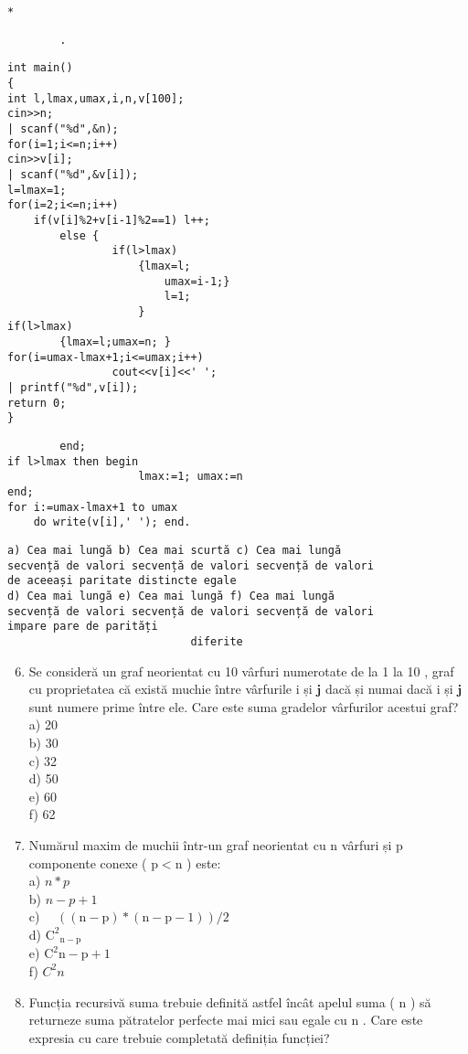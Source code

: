 \begin{verbatim}
*
\end{verbatim}

\begin{verbatim}
        .
\end{verbatim}

\begin{verbatim}
int main()
{
int l,lmax,umax,i,n,v[100];
cin>>n;
| scanf("%d",&n);
for(i=1;i<=n;i++)
cin>>v[i];
| scanf("%d",&v[i]);
l=lmax=1;
for(i=2;i<=n;i++)
    if(v[i]%2+v[i-1]%2==1) l++;
        else {
                if(l>lmax)
                    {lmax=l;
                        umax=i-1;}
                        l=1;
                    }
if(l>lmax)
        {lmax=l;umax=n; }
for(i=umax-lmax+1;i<=umax;i++)
                cout<<v[i]<<' ';
| printf("%d",v[i]);
return 0;
}
\end{verbatim}

\begin{verbatim}
        end;
if l>lmax then begin
                    lmax:=1; umax:=n
end;
for i:=umax-lmax+1 to umax
    do write(v[i],' '); end.
\end{verbatim}

\begin{verbatim}
a) Cea mai lungă b) Cea mai scurtă c) Cea mai lungă
secvență de valori secvență de valori secvență de valori
de aceeași paritate distincte egale
d) Cea mai lungă e) Cea mai lungă f) Cea mai lungă
secvență de valori secvență de valori secvență de valori
impare pare de parități
                            diferite
\end{verbatim}

\begin{enumerate}
  \setcounter{enumi}{5}
  \item Se consideră un graf neorientat cu 10 vârfuri numerotate de la 1 la 10 , graf cu proprietatea că există muchie între vârfurile i și $\mathbf{j}$ dacă și numai dacă i și $\mathbf{j}$ sunt numere prime între ele. Care este suma gradelor vârfurilor acestui graf?\\
a) 20\\
b) 30\\
c) 32\\
d) 50\\
e) 60\\
f) 62
  \item Numărul maxim de muchii într-un graf neorientat cu n vârfuri și p componente conexe ( $\mathrm{p}<\mathrm{n}$ ) este:\\
a) $n * p$\\
b) $n-p+1$\\
c) $\quad((\mathrm{n}-\mathrm{p}) *(\mathrm{n}-\mathrm{p}-1)) / 2$\\
d) $\mathrm{C}^{2}{ }_{\mathrm{n}-\mathrm{p}}$\\
e) $\mathrm{C}^{2} \mathrm{n}-\mathrm{p}+1$\\
f) $C^{2} n$
  \item Funcția recursivă suma trebuie definită astfel încât apelul suma ( n ) să returneze suma pătratelor perfecte mai mici sau egale cu n . Care este expresia cu care trebuie completată definiția funcției?
\end{enumerate}

